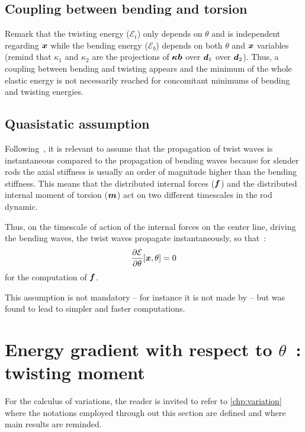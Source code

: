\subsection{Coupling between bending and torsion}
Remark that the twisting energy ($\mathcal{E}_{t}$) only depends on $\theta$ and is independent regarding $\boldsymbol{x}$ while the bending energy ($\mathcal{E}_{b}$) depends on both $\theta$ and $\boldsymbol{x}$ variables (remind that $\kappa_1$ and $\kappa_2$ are the projections of $\boldsymbol{\kappa b}$ over $\boldsymbol{d}_1$ over $\boldsymbol{d}_2$). Thus, a coupling between bending and twisting appears and the minimum of the whole elastic energy is not necessarily reached for concomitant minimums of bending and twisting energies.

\subsection{Quasistatic assumption}
Following~, it is relevant to assume that the propagation of twist waves is instantaneous compared to the propagation of bending waves because for slender rods the axial stiffness is usually an order of magnitude higher than the bending stiffness. This means that the distributed internal forces ($\boldsymbol{f}$) and the  distributed internal moment of torsion ($\boldsymbol{m}$) act on two different timescales in the rod dynamic.

Thus, on the timescale of action of the internal forces on the center line, driving the bending waves, the twist waves propagate instantaneously, so that~:
\begin{equation}
	\frac{\partial \mathcal{E}}{\partial\theta}[\boldsymbol{x}, \theta]=0
\label{eq:quasistat_hyp}
\end{equation}
for the computation of $\boldsymbol{f}$.

This assumption is not mandatory -- for instance it is not made by  -- but was found to lead to simpler and faster computations.

\section{Energy gradient with respect to $\theta$~: twisting moment}\label{eq:dE_dtheta}

For the calculus of variations, the reader is invited to refer to \cref{chp:variation} where the notations employed through out this section are defined and where main results are reminded. 

